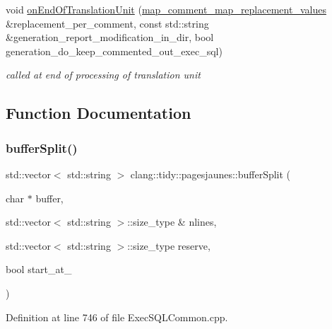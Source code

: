 \begin{DoxyCompactItemize}
$$void \hyperlink{namespaceclang_1_1tidy_1_1pagesjaunes_ac8e5dd22a5698742b52fd8207096a3de}{on\+End\+Of\+Translation\+Unit} (\hyperlink{_exec_s_q_l_common_8h_a488fa487a3b35e0a4a38116ffab0a469}{map\+\_\+comment\+\_\+map\+\_\+replacement\+\_\+values} \&replacement\+\_\+per\+\_\+comment, const std\+::string \&generation\+\_\+report\+\_\+modification\+\_\+in\+\_\+dir, bool generation\+\_\+do\+\_\+keep\+\_\+commented\+\_\+out\+\_\+exec\+\_\+sql)
\begin{DoxyCompactList}\small\item\em called at end of processing of translation unit \end{DoxyCompactList}\end{DoxyCompactItemize}


\subsection{Function Documentation}
\mbox{\label{namespaceclang_1_1tidy_1_1pagesjaunes_aba7a8f3d6ead090299ad745421c3f77e}} 
\subsubsection{\texorpdfstring{buffer\+Split()}{bufferSplit()}}
{\footnotesize\ttfamily std\+::vector$<$ std\+::string $>$ clang\+::tidy\+::pagesjaunes\+::buffer\+Split (\begin{DoxyParamCaption}\item[{char $\ast$}]{buffer,  }\item[{std\+::vector$<$ std\+::string $>$\+::size\+\_\+type \&}]{nlines,  }\item[{std\+::vector$<$ std\+::string $>$\+::size\+\_\+type}]{reserve,  }\item[{bool}]{start\+\_\+at\+\_ }\end{DoxyParamCaption})}



Definition at line 746 of file Exec\+S\+Q\+L\+Common.\+cpp.

